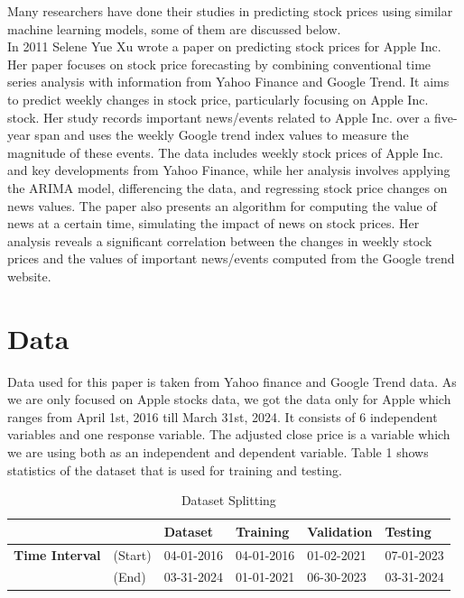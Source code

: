 \documentclass[conference,onecolumn,11pt]{IEEEtran}
\begin{document}
Many researchers have done their studies in predicting stock prices using similar  machine learning models, some of them are discussed below. \\
In 2011 Selene Yue Xu wrote a paper on predicting stock prices for Apple Inc. Her paper focuses on stock price forecasting by combining conventional time series analysis with information from Yahoo Finance and Google Trend. It aims to predict weekly changes in stock price, particularly focusing on Apple Inc. stock. Her study records important news/events related to Apple Inc. over a five-year span and uses the weekly Google trend index values to measure the magnitude of these events. The data includes weekly stock prices of Apple Inc. and key developments from Yahoo Finance, while her analysis involves applying the ARIMA model, differencing the data, and regressing stock price changes on news values. The paper also presents an algorithm for computing the value of news at a certain time, simulating the impact of news on stock prices. Her analysis reveals a significant correlation between the changes in weekly stock prices and the values of important news/events computed from the Google trend website.\\



\section{Data}
Data used for this paper is taken from Yahoo finance and Google Trend data. As we are only focused on Apple stocks data, we got the data only for Apple which ranges from April 1st, 2016 till March 31st, 2024. It consists of 6 independent variables and one response variable. The adjusted close price is a variable which we are using both as an independent and dependent variable. Table 1 shows statistics of the dataset that is used for training and testing.

\begin{table}[htbp]
    \centering
    \caption{Dataset Splitting}
    \begin{tabular}{@{}rlllll@{}}
        \toprule
         && \textbf{Dataset} & \textbf{Training} & \textbf{Validation} & \textbf{Testing} \\
        \midrule
        \textbf{Time Interval} &(Start) & 04-01-2016 & 04-01-2016 & 01-02-2021 & 07-01-2023\\
        &(End)& 03-31-2024 & 01-01-2021 & 06-30-2023 & 03-31-2024\\
  
        \bottomrule
    \end{tabular}
    \label{tab:GFS}
\end{table}
\end{document}
